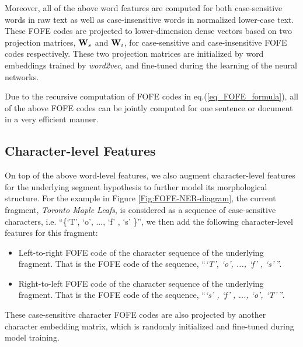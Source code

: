 \documentclass[11pt,a4paper]{article}
\begin{document}
Moreover, all of the above word features are computed for both case-sensitive words in raw text as well as case-insensitive words in normalized lower-case text. These FOFE codes are projected to lower-dimension dense vectors based on two projection matrices, ${\bf W}_s$ and ${\bf W}_i$, for case-sensitive and case-insensitive FOFE codes respectively. These two projection matrices are initialized by word embeddings trained by {\it word2vec}, and fine-tuned during the learning of the neural networks. 

Due to the recursive computation of FOFE codes in eq.(\ref{eq_FOFE_formula}), all of the above FOFE codes can be jointly computed for one sentence or document in a very efficient manner. 


\subsection{Character-level Features}

On top of the above word-level features, we also augment character-level features for the underlying segment hypothesis to further model its morphological structure. For the example in Figure \ref{Fig:FOFE-NER-diagram}, the current fragment, {\it Toronto Maple Leafs}, is considered as a sequence of case-sensitive characters, i.e. ``\{`T', `o', ..., `f' , `s'  \}'', we then add the following character-level features for this fragment:
\begin{itemize}
	\item Left-to-right FOFE code of the character sequence of the underlying fragment. That is the FOFE code of the sequence, ``{\it  `T', `o', ..., `f' , `s' }''.
	
	\item Right-to-left FOFE code of the character sequence of the underlying fragment. That is the FOFE code of the sequence, ``{\it `s' ,  `f' , ..., `o',  `T' }''.
\end{itemize}
These case-sensitive character FOFE codes are also projected by another character embedding matrix, which is randomly initialized and fine-tuned during model training. 
\end{document}
